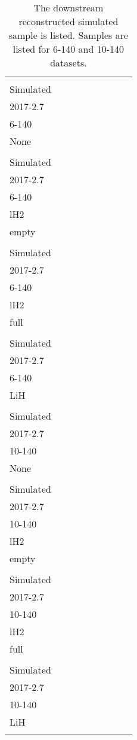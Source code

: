 \begin{landscape}
\begin{table}
\centering
\caption{The downstream reconstructed simulated sample is listed.  Samples are listed for 6-140 and 10-140 datasets.\label{tab:mc_cuts_summary_1_1}}
\begin{tabular}[pos]{l|cccccccc}
                                                   & \splitcell{\\Simulated\\2017-2.7\\6-140\\None\\} & \splitcell{\\Simulated\\2017-2.7\\6-140\\lH2\\empty\\} & \splitcell{\\Simulated\\2017-2.7\\6-140\\lH2\\full\\} & \splitcell{\\Simulated\\2017-2.7\\6-140\\LiH\\} & \splitcell{\\Simulated\\2017-2.7\\10-140\\None\\} & \splitcell{\\Simulated\\2017-2.7\\10-140\\lH2\\empty\\} & \splitcell{\\Simulated\\2017-2.7\\10-140\\lH2\\full\\} & \splitcell{\\Simulated\\2017-2.7\\10-140\\LiH\\} \\

\end{tabular}
\end{table}
\end{landscape}
